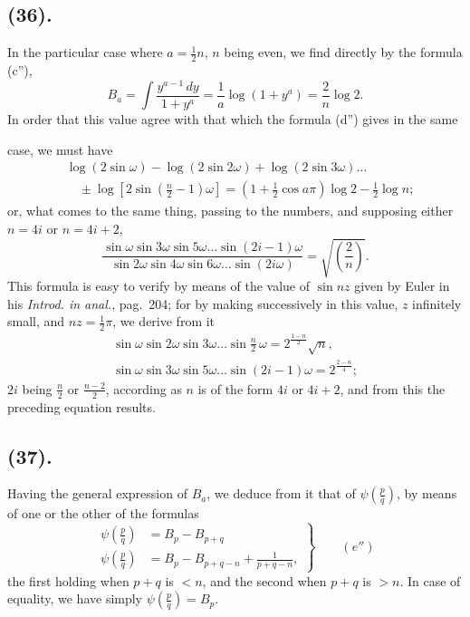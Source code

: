 \documentclass{article}
\begin{document}
\subsection*{(36).}

In the particular case where $a=\frac{1}{2}n$, $n$ being even, we find directly by the formula (c''),
\[ B_{a}=\int\frac{y^{a-1}\,dy}{1+y^{a}}=\frac{1}{a}\log(1+y^{a})=\frac{2}{n}\log 2. \]
In order that this value agree with that which the formula (d'') gives in the same

case, we must have
\[ \begin{aligned} &\log(2\sin\omega)-\log(2\sin 2\omega)+\log(2\sin 3\omega)\ldots\\ &\quad\pm\log\left[2\sin\left(\frac{n}{2}-1\right)\omega\right]=\left(1+\tfrac{1}{2}\cos a\pi\right)\log 2-\tfrac{1}{2}\log n; \end{aligned} \]
or, what comes to the same thing, passing to the numbers, and supposing either $n=4i$ or $n=4i+2$,
\[ \frac{\sin\omega\sin 3\omega\sin 5\omega\ldots\sin(2i-1)\omega}{\sin 2\omega\sin 4\omega\sin 6\omega\ldots\sin(2i\omega)}=\sqrt{\left(\frac{2}{n}\right)}. \]
This formula is easy to verify by means of the value of $\sin nz$ given by Euler in his \emph{Introd. in anal.}, pag.~204; for by making successively in this value, $z$ infinitely small, and $nz=\frac{1}{2}\pi$, we derive from it
\[ \begin{gathered} \sin\omega\sin 2\omega\sin 3\omega\ldots\sin\frac{n}{2}\,\omega=2^{\frac{1-n}{2}}\sqrt{n},\\ \sin\omega\sin 3\omega\sin 5\omega\ldots\sin(2i-1)\omega=2^{\frac{2-n}{4}}; \end{gathered} \]
$2i$ being $\frac{n}{2}$ or $\frac{n-2}{2}$, according as $n$ is of the form $4i$ or $4i+2$, and from this the preceding equation results.

\subsection*{(37).}

Having the general expression of $B_{a}$, we deduce from it that of $\psi\left(\frac{p}{q}\right)$, by means of one or the other of the formulas
\[ \left.\begin{aligned} \psi\left(\frac{p}{q}\right)&=B_{p}-B_{p+q}\\ \psi\left(\frac{p}{q}\right)&=B_{p}-B_{p+q-n}+\frac{1}{p+q-n}, \end{aligned}\right\}\qquad(e'') \]
the first holding when $p+q$ is $<n$, and the second when $p+q$ is $>n$. In case of equality, we have simply $\psi\left(\frac{p}{q}\right)=B_{p}$.
\end{document}
